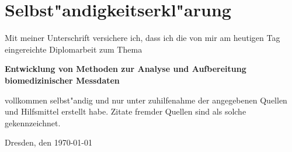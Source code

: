 \chapter*{Selbst"andigkeitserkl"arung}

Mit meiner Unterschrift versichere ich, dass ich die von mir am heutigen Tag eingereichte Diplomarbeit zum Thema
\begin{center}
	\textbf{Entwicklung von Methoden zur Analyse und Aufbereitung biomedizinischer Messdaten}
\end{center}
vollkommen selbst"andig und nur unter zuhilfenahme der angegebenen Quellen und Hilfsmittel erstellt habe.
Zitate fremder Quellen sind als solche gekennzeichnet.

\vspace{3cm}\noindent\hspace{1.5cm}
Dresden, den \today
